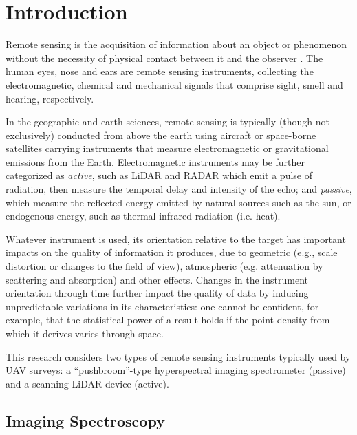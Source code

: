 \label{chapter:lit_review}

\newlength{\savedunitlength}
\setlength{\unitlength}{2em}

\section{Introduction}

Remote sensing is the acquisition of information about an object or phenomenon without the necessity of physical contact between it and the observer \cite{Gupta2018}. The human eyes, nose and ears are remote sensing instruments, collecting the electromagnetic, chemical and mechanical signals that comprise sight, smell and hearing, respectively.

In the geographic and earth sciences, remote sensing is typically (though not exclusively) conducted from above the earth using aircraft or space-borne satellites carrying instruments that measure electromagnetic or gravitational emissions from the Earth. Electromagnetic instruments may be further categorized as \emph{active}, such as LiDAR and RADAR which emit a pulse of radiation, then measure the temporal delay and intensity of the echo; and \emph{passive}, which measure the reflected energy emitted by natural sources such as the sun, or endogenous energy, such as thermal infrared radiation (i.e. heat).

Whatever instrument is used, its orientation relative to the target has important impacts on the quality of information it produces, due to geometric (e.g., scale distortion or changes to the field of view), atmospheric (e.g. attenuation by scattering and absorption) and other effects. Changes in the instrument orientation through time further impact the quality of data by inducing unpredictable variations in its characteristics: one cannot be confident, for example, that the statistical power of a result holds if the point density from which it derives varies through space.

This research considers two types of remote sensing instruments typically used by UAV surveys: a ``pushbroom''-type hyperspectral imaging spectrometer (passive) and a scanning LiDAR device (active). 


\subsection{Imaging Spectroscopy}

